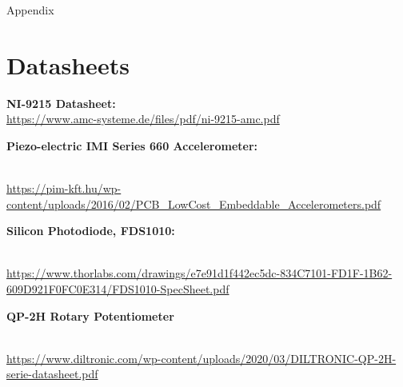 \documentclass{article}
\begin{document}
\newpage
\thispagestyle{empty}  %
\begin{center}
	\vspace*{\fill}
	{\Huge Appendix}
	\vspace*{\fill}
\end{center}

\newpage
\begin{appendices}
\pagestyle{fancy}
\renewcommand{\thefigure}{A\arabic{figure}}
\setcounter{figure}{0}



\pagebreak

\hypertarget{datasheets}{}
\section{Datasheets}
\begin{enumerate}[label = {[\arabic*]}]
\small
\item \textbf{NI-9215 Datasheet:}\\[2pt] \url{https://www.amc-systeme.de/files/pdf/ni-9215-amc.pdf}
\item \hypertarget{2}{\textbf{Piezo-electric IMI Series 660 Accelerometer:}}\\[2pt] \url{https://pim-kft.hu/wp-content/uploads/2016/02/PCB_LowCost_Embeddable_Accelerometers.pdf}
\item \hypertarget{3}{\textbf{Silicon Photodiode, FDS1010:}}\\[2pt] \url{https://www.thorlabs.com/drawings/e7e91d1f442ec5dc-834C7101-FD1F-1B62-609D921F0FC0E314/FDS1010-SpecSheet.pdf}
\item \hypertarget{4}{\textbf{QP-2H Rotary Potentiometer}}\\[2pt] \url{https://www.diltronic.com/wp-content/uploads/2020/03/DILTRONIC-QP-2H-serie-datasheet.pdf}


\end{enumerate}

\end{appendices}
\end{document}
